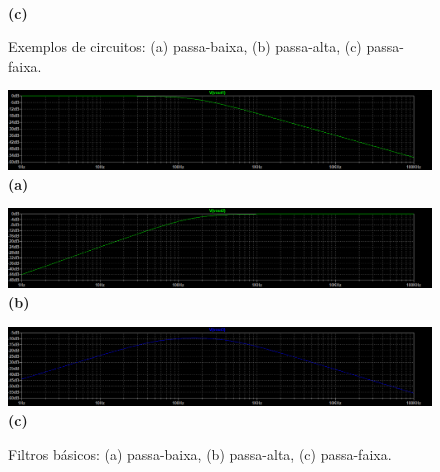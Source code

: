 \begin{figure}[h!]
\begin{minipage}[b]{0.49\linewidth}
        \centering
        \\ \textbf{(c)}
    \end{minipage}
    \caption{Exemplos de circuitos: (a) passa-baixa, (b) passa-alta, (c) passa-faixa.}
    \label{fig:filtros_reais}
\end{figure}

\begin{figure}[h!]
    \centering
    \begin{minipage}[b]{0.9\linewidth}
        \includegraphics[width=\linewidth]{figuras/LT_pb.png}
        \centering
        \\ \textbf{(a)}
    \end{minipage}
    \begin{minipage}[b]{0.9\linewidth}
        \includegraphics[width=\linewidth]{figuras/LT_pa.png}
        \centering
        \\ \textbf{(b)}
    \end{minipage}
    \begin{minipage}[b]{0.9\linewidth}     
        \includegraphics[width=\linewidth]{figuras/LT_pf.png}
        \centering
        \\ \textbf{(c)}
    \end{minipage}
    \caption{Filtros básicos: (a) passa-baixa, (b) passa-alta, (c) passa-faixa.}
    \label{fig:LT_circuitos}
\end{figure}